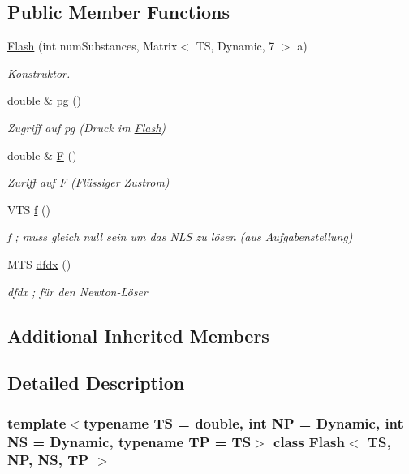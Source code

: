 \subsection*{Public Member Functions}
\begin{DoxyCompactItemize}
\item 
\mbox{\hyperlink{class_flash_afe08d3b05a9b5abe02071065b46abf62}{Flash}} (int num\+Substances, Matrix$<$ TS, Dynamic, 7 $>$ a)
\begin{DoxyCompactList}\small\item\em Konstruktor. \end{DoxyCompactList}\item 
double \& \mbox{\hyperlink{class_flash_ac3cec3cdb03bd71e7b32d7e77a209308}{pg}} ()
\begin{DoxyCompactList}\small\item\em Zugriff auf pg (Druck im \mbox{\hyperlink{class_flash}{Flash}}) \end{DoxyCompactList}\item 
double \& \mbox{\hyperlink{class_flash_ac44eff7052e26a0075c21b4f068e162e}{F}} ()
\begin{DoxyCompactList}\small\item\em Zuriff auf F (Flüssiger Zustrom) \end{DoxyCompactList}\item 
V\+TS \mbox{\hyperlink{class_flash_ad29e755877ca96aa5b9f34a10d6cd8b2}{f}} ()
\begin{DoxyCompactList}\small\item\em f ; muss gleich null sein um das N\+LS zu lösen (aus Aufgabenstellung) \end{DoxyCompactList}\item 
M\+TS \mbox{\hyperlink{class_flash_a83e35b3ab13b3705f0fe06c40b800a8b}{dfdx}} ()
\begin{DoxyCompactList}\small\item\em dfdx ; für den Newton-\/\+Löser \end{DoxyCompactList}\end{DoxyCompactItemize}
\subsection*{Additional Inherited Members}


\subsection{Detailed Description}
\subsubsection*{template$<$typename TS = double, int NP = Dynamic, int NS = Dynamic, typename TP = TS$>$\newline
class Flash$<$ T\+S, N\+P, N\+S, T\+P $>$}

